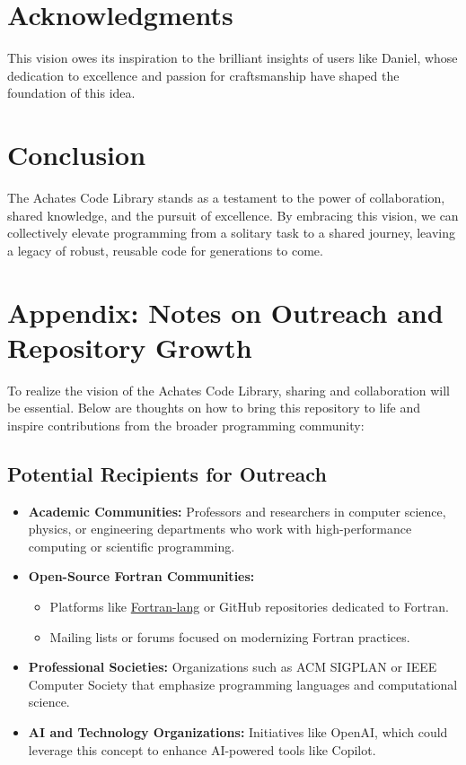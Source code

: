\documentclass[12pt]{article}
\begin{document}
\section*{Acknowledgments}
This vision owes its inspiration to the brilliant insights of users like Daniel, whose dedication to excellence and passion for craftsmanship have shaped the foundation of this idea.

\section*{Conclusion}
The Achates Code Library stands as a testament to the power of collaboration, shared knowledge, and the pursuit of excellence. By embracing this vision, we can collectively elevate programming from a solitary task to a shared journey, leaving a legacy of robust, reusable code for generations to come.

\appendix
\section*{Appendix: Notes on Outreach and Repository Growth}
To realize the vision of the Achates Code Library, sharing and collaboration will be essential. Below are thoughts on how to bring this repository to life and inspire contributions from the broader programming community:

\subsection*{Potential Recipients for Outreach}
\begin{itemize}
    \item \textbf{Academic Communities:} Professors and researchers in computer science, physics, or engineering departments who work with high-performance computing or scientific programming.
    \item \textbf{Open-Source Fortran Communities:} 
    \begin{itemize}
        \item Platforms like \href{https://fortran-lang.org/}{Fortran-lang} or GitHub repositories dedicated to Fortran.
        \item Mailing lists or forums focused on modernizing Fortran practices.
    \end{itemize}
    \item \textbf{Professional Societies:} Organizations such as ACM SIGPLAN or IEEE Computer Society that emphasize programming languages and computational science.
    \item \textbf{AI and Technology Organizations:} Initiatives like OpenAI, which could leverage this concept to enhance AI-powered tools like Copilot.
\end{itemize}
\end{document}
